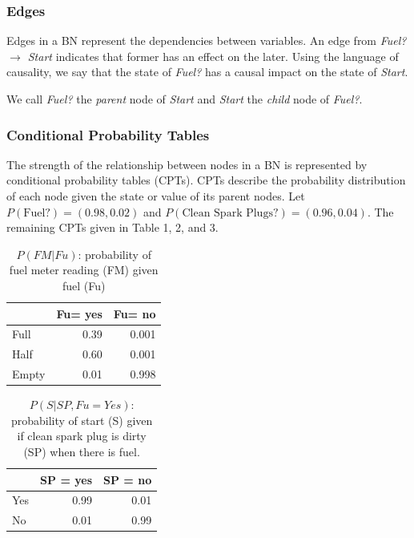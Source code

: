 \documentclass[twocol]{ametsoc}
\begin{document}
\hypertarget{edges}{%
\subsubsection{Edges}\label{edges}}

Edges in a BN represent the dependencies between variables. An edge from
\emph{Fuel? \(\to\) Start} indicates that former has an effect on the
later. Using the language of causality, we say that the state of
\emph{Fuel?} has a causal impact on the state of \emph{Start}.

We call \emph{Fuel?} the \emph{parent} node of \emph{Start} and
\emph{Start} the \emph{child} node of \emph{Fuel?}.

\hypertarget{conditional-probability-tables}{%
\subsubsection{Conditional Probability
Tables}\label{conditional-probability-tables}}

The strength of the relationship between nodes in a BN is represented by
conditional probability tables (CPTs). CPTs describe the probability
distribution of each node given the state or value of its parent nodes.
Let \(P(\text{Fuel?}) = (0.98, 0.02)\) and
\(P(\text{Clean Spark Plugs?}) = (0.96, 0.04)\). The remaining CPTs
given in Table 1, 2, and 3.

\begin{table}

\caption{\label{tab:toy_table}$P(FM|Fu)$: probability of fuel meter reading (FM) given fuel (Fu)}
\centering
\begin{tabular}[t]{l|r|r}
\hline
  & Fu= yes & Fu= no\\
\hline
Full & 0.39 & 0.001\\
\hline
Half & 0.60 & 0.001\\
\hline
Empty & 0.01 & 0.998\\
\hline
\end{tabular}
\end{table}

\begin{table}

\caption{\label{tab:toy_table}$P(S|SP, Fu = Yes)$: probability of start (S) given if clean spark plug is dirty (SP) when there is fuel.}
\centering
\begin{tabular}[t]{l|r|r}
\hline
  & SP = yes & SP = no\\
\hline
Yes & 0.99 & 0.01\\
\hline
No & 0.01 & 0.99\\
\hline
\end{tabular}
\end{table}
\end{document}
